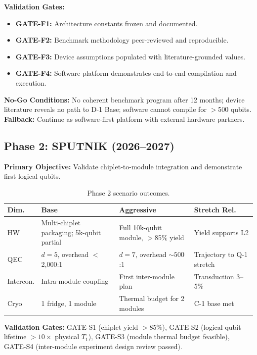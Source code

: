 \documentclass[conference]{IEEEtran}
\begin{document}
\textbf{Validation Gates:}
\begin{itemize}[leftmargin=*]
\item \textbf{GATE-F1:} Architecture constants frozen and documented.
\item \textbf{GATE-F2:} Benchmark methodology peer-reviewed and reproducible.
\item \textbf{GATE-F3:} Device assumptions populated with literature-grounded values.
\item \textbf{GATE-F4:} Software platform demonstrates end-to-end compilation and execution.
\end{itemize}

\textbf{No-Go Conditions:} No coherent benchmark program after 12 months; device literature reveals no path to D-1 Base; software cannot compile for $>$500 qubits. \textbf{Fallback:} Continue as software-first platform with external hardware partners.

\subsection{Phase 2: SPUTNIK (2026--2027)}

\textbf{Primary Objective:} Validate chiplet-to-module integration and demonstrate first logical qubits.

\begin{table}[H]
\centering
\caption{Phase 2 scenario outcomes.}
\begin{tabular}{@{}l L{2cm} L{2cm} L{2cm}@{}}
\toprule
\textbf{Dim.} & \textbf{Base} & \textbf{Aggressive} & \textbf{Stretch Rel.} \\
\midrule
HW & Multi-chiplet packaging; 5k-qubit partial & Full 10k-qubit module, $>$85\% yield & Yield supports L2 \\
QEC & $d{=}5$, overhead $<$2,000:1 & $d{=}7$, overhead ${\sim}500$:1 & Trajectory to Q-1 stretch \\
Intercon. & Intra-module coupling & First inter-module plan & Transduction 3--5\% \\
Cryo & 1 fridge, 1 module & Thermal budget for 2 modules & C-1 base met \\
\bottomrule
\end{tabular}
\end{table}

\textbf{Validation Gates:} GATE-S1 (chiplet yield $>$85\%), GATE-S2 (logical qubit lifetime $>10\times$ physical $T_1$), GATE-S3 (module thermal budget feasible), GATE-S4 (inter-module experiment design review passed).
\end{document}
